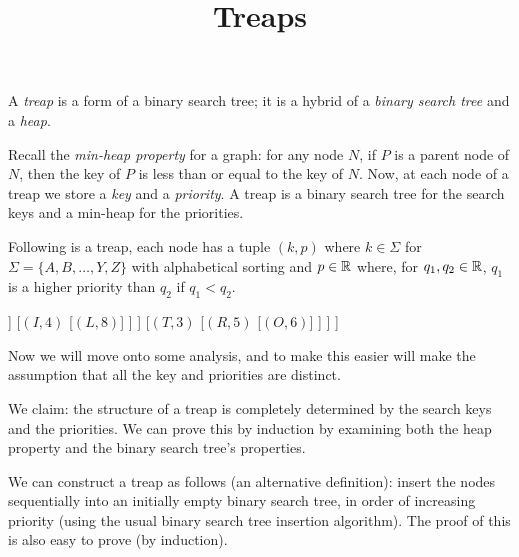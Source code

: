 \documentclass[a4paper]{article}
\begin{document}
\title{Treaps}
\maketitle

A \emph{treap} is a form of a binary search tree;
it is a hybrid of a \emph{binary search tree} and a \emph{heap}.

Recall the \emph{min-heap property} for a graph:
for any node $N$, if $P$ is a parent node of $N$, then the key of
$P$ is less than or equal to the key of $N$.
Now, at each node of a treap we store a \emph{key} and a \emph{priority}.
A treap is a binary search tree for the search keys
and a min-heap for the priorities.

Following is a treap, each node has a tuple $(k, p)$ where $k \in \Sigma$ for
$\Sigma = \{A,B,\ldots, Y,Z\}$ with alphabetical sorting and
$p \in \mathbb{R}$ where, for $q_1, q_2 \in \mathbb{R}$, $q_1$ is a higher priority than
$q_2$ if $q_1 < q_2$.

\begin{center}
	\begin{forest}
		[{$(M,1)$}
			[{$(H,2)$}
				[{$(G,7)$}
					[{$(A,9)$}]
				]
				[{$(I,4)$}
					[{$(L,8)$}]
				]
			]
			[{$(T,3)$}
				[{$(R,5)$}
					[{$(O,6)$}]
				]
			]
		]
	\end{forest}
\end{center}

Now we will move onto some analysis, and to make this easier will make
the assumption that all the key and priorities are distinct.

We claim: the structure of a treap is completely determined by the search
keys and the priorities. 
We can prove this by induction by examining both the heap property
and the binary search tree's properties.

We can construct a treap as follows (an alternative definition):
insert the nodes sequentially into an initially empty binary search tree,
in order of increasing priority
(using the usual binary search tree insertion algorithm).
The proof of this is also easy to prove (by induction).
\end{document}
